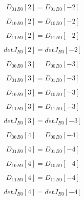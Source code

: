 \documentclass{article}
\begin{document}
\begin{dmath}{D_{01}{_{B0}}}[{2}] = {D_{01}{_{B0}}}[{-2}]\end{dmath}

\begin{dmath}{D_{10}{_{B0}}}[{2}] = {D_{10}{_{B0}}}[{-2}]\end{dmath}

\begin{dmath}{D_{11}{_{B0}}}[{2}] = {D_{11}{_{B0}}}[{-2}]\end{dmath}

\begin{dmath}{detJ{_{B0}}}[{2}] = {detJ{_{B0}}}[{-2}]\end{dmath}

\begin{dmath}{D_{00}{_{B0}}}[{3}] = {D_{00}{_{B0}}}[{-3}]\end{dmath}

\begin{dmath}{D_{01}{_{B0}}}[{3}] = {D_{01}{_{B0}}}[{-3}]\end{dmath}

\begin{dmath}{D_{10}{_{B0}}}[{3}] = {D_{10}{_{B0}}}[{-3}]\end{dmath}

\begin{dmath}{D_{11}{_{B0}}}[{3}] = {D_{11}{_{B0}}}[{-3}]\end{dmath}

\begin{dmath}{detJ{_{B0}}}[{3}] = {detJ{_{B0}}}[{-3}]\end{dmath}

\begin{dmath}{D_{00}{_{B0}}}[{4}] = {D_{00}{_{B0}}}[{-4}]\end{dmath}

\begin{dmath}{D_{01}{_{B0}}}[{4}] = {D_{01}{_{B0}}}[{-4}]\end{dmath}

\begin{dmath}{D_{10}{_{B0}}}[{4}] = {D_{10}{_{B0}}}[{-4}]\end{dmath}

\begin{dmath}{D_{11}{_{B0}}}[{4}] = {D_{11}{_{B0}}}[{-4}]\end{dmath}

\begin{dmath}{detJ{_{B0}}}[{4}] = {detJ{_{B0}}}[{-4}]\end{dmath}
\end{document}

